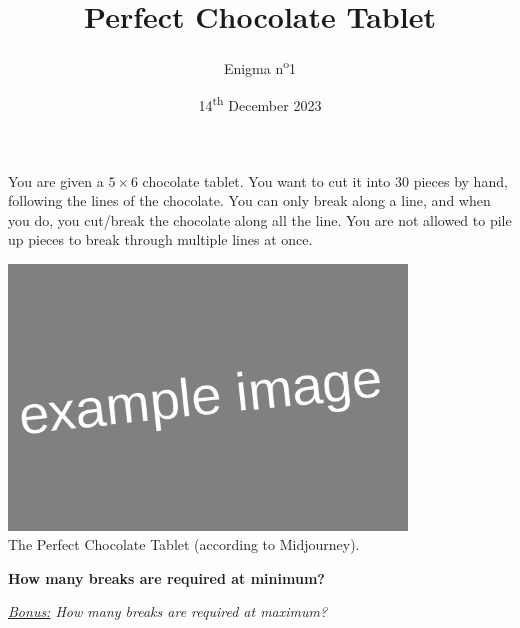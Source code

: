 \documentclass[a4paper, top=10mm]{article}
\title{\textbf{\huge{Perfect Chocolate Tablet}}}
\author{Enigma n\textsuperscript{o}1}
\date{14\textsuperscript{th} December 2023}
\begin{document}
	\maketitle
	
	You are given a $5 \times 6$ chocolate tablet.
	You want to cut it into $30$ pieces by hand, following the lines of the chocolate.
	You can only break along a line, and when you do, you cut/break the chocolate along all the line.
	You are not allowed to pile up pieces to break through multiple lines at once.
	
	\begin{center}
		\includegraphics[height=200pt]{00example.png}\\
		The Perfect Chocolate Tablet (according to Midjourney).
	\end{center}
	
	\textbf{How many breaks are required at minimum?}
	
	\vspace{2cm}
	
	\textit{\underline{Bonus:} How many breaks are required at maximum?}
	
	
\end{document}
